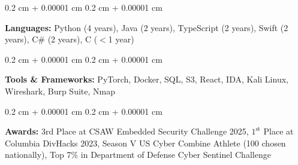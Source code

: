 \documentclass[10pt, letterpaper]{article}
\newenvironment{onecolentry}{ \begin{adjustwidth}{ 0.2 cm + 0.00001 cm }{ 0.2 cm + 0.00001 cm }
}{ \end{adjustwidth} } %
\begin{document}
	\begin{onecolentry}
		\textbf{Languages:} Python (4 years), Java (2 years), TypeScript (2 years), Swift
		(2 years), C\# (2 years), C ($<$1 year)
	\end{onecolentry}

	\vspace{0.10 cm}

	\begin{onecolentry}
		\textbf{Tools \& Frameworks:} PyTorch, Docker, SQL, S3, React, IDA, Kali Linux, Wireshark, Burp Suite, Nmap
	\end{onecolentry}

	\vspace{0.10 cm}

	\begin{onecolentry}
		\textbf{Awards:} $3{\text{rd}}$ Place at CSAW Embedded Security Challenge 2025, $1^{\text{st}}$ Place at Columbia DivHacks 2023, Season V US Cyber Combine Athlete (100 chosen nationally), Top 7\% in Department of Defense Cyber Sentinel Challenge
	\end{onecolentry}
\end{document}
